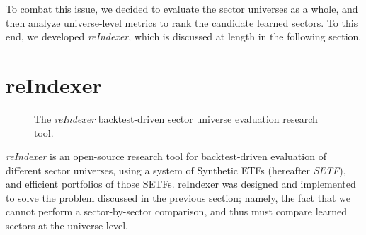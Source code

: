 \documentclass[../main.tex]{subfiles}
\begin{document}
To combat this issue, we decided to evaluate the sector universes as a whole, and then analyze universe-level metrics to rank the candidate learned sectors. To this end, we developed \textit{reIndexer}, which is discussed at length in the following section.

\section{reIndexer} \label{candidate_universe_ranking:reindexer}

\begin{figure}
    \centering
    \vspace{\wrapfigadjustment}
    \caption{The \textit{reIndexer} backtest-driven sector universe evaluation research tool.}
    \label{fig:candidate_universe_ranking:reindexer_logo}
\end{figure}

\textit{reIndexer} is an open-source research tool for backtest-driven evaluation of different sector universes, using a system of Synthetic ETFs (hereafter \textit{SETF}), and efficient portfolios of those SETFs. reIndexer was designed and implemented to solve the problem discussed in the previous section; namely, the fact that we cannot perform a sector-by-sector comparison, and thus must compare learned sectors at the universe-level.
\end{document}
